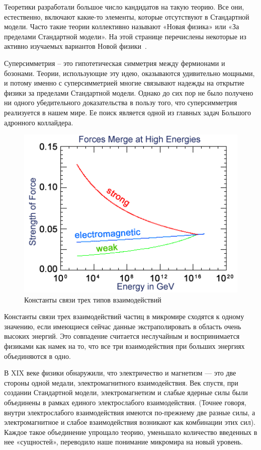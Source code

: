 Теоретики разработали большое число кандидатов на такую теорию. Все они, естественно, включают какие-то элементы, которые отсутствуют в Стандартной модели. Часто такие теории коллективно называют «Новая физика» или «За пределами Стандартной модели». На этой странице перечислены некоторые из активно изучаемых вариантов Новой физики~\cite{2part-1}.

Суперсимметрия -- это гипотетическая симметрия между фермионами и бозонами. Теории, использующие эту идею, оказываются удивительно мощными, и потому именно с суперсимметрией многие связывают надежды на открытие физики за пределами Стандартной модели. Однако до сих пор не было получено ни одного убедительного доказательства в пользу того, что суперсимметрия реализуется в нашем мире. Ее поиск является одной из главных задач Большого адронного коллайдера.
\begin{figure}[h]
	\centering
	\includegraphics[width=\textwidth]{figures/hep-sm.png}
	\caption{Константы связи трех типов взаимодействий}
	\label{fig:fig01}
\end{figure}
Константы связи трех взаимодействий частиц в микромире сходятся к одному значению, если имеющиеся сейчас данные экстраполировать в область очень высоких энергий. Это совпадение считается неслучайным и воспринимается физиками как намек на то, что все три взаимодействия при больших энергиях объединяются в одно.

В XIX веке физики обнаружили, что электричество и магнетизм — это две стороны одной медали, электромагнитного взаимодействия. Век спустя, при создании Стандартной модели, электромагнетизм и слабые ядерные силы были объединены в рамках единого электрослабого взаимодействия. (Точнее говоря, внутри электрослабого взаимодействия имеются по-прежнему две разные силы, а электромагнитное и слабое взаимодействия возникают как комбинации этих сил). Каждое такое объединение упрощало теорию, уменьшало количество введенных в нее «сущностей», переводило наше понимание микромира на новый уровень.

